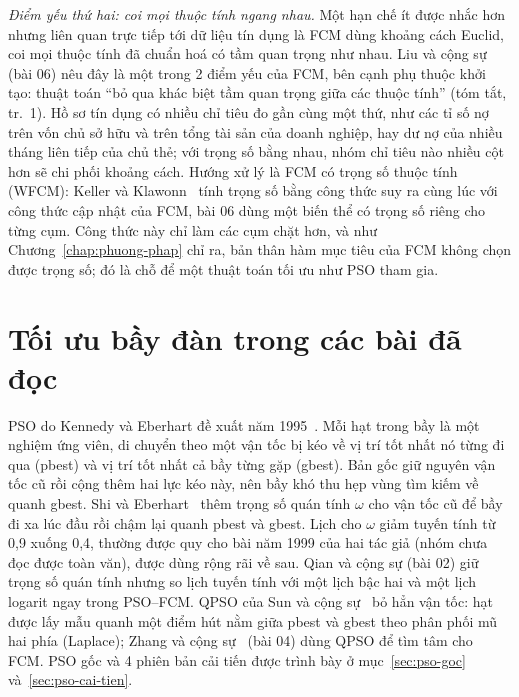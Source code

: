 \emph{Điểm yếu thứ hai: coi mọi thuộc tính ngang nhau.} Một hạn chế ít được nhắc hơn nhưng liên quan trực tiếp tới dữ liệu tín dụng là FCM dùng khoảng cách Euclid, coi mọi thuộc
tính đã chuẩn hoá có tầm quan trọng như nhau. Liu và cộng sự~\cite{liu2021msgwo} (bài 06) nêu đây là một trong 2 điểm yếu
của FCM, bên cạnh phụ thuộc khởi tạo: thuật toán ``bỏ qua khác biệt tầm quan trọng giữa các thuộc tính'' (tóm tắt, tr.~1).
Hồ sơ tín dụng có nhiều chỉ tiêu đo gần cùng một thứ, như các tỉ số nợ trên vốn chủ sở hữu và trên tổng tài sản của doanh
nghiệp, hay dư nợ của nhiều tháng liên tiếp của chủ thẻ; với trọng số bằng nhau, nhóm chỉ tiêu nào nhiều cột hơn sẽ chi
phối khoảng cách. Hướng xử lý là FCM có trọng số thuộc tính (WFCM): Keller và Klawonn~\cite{keller2000weighting} tính trọng
số bằng công thức suy ra cùng lúc với công thức cập nhật của FCM, bài 06 dùng một biến thể có trọng số riêng cho từng cụm.
Công thức này chỉ làm các cụm chặt hơn, và như Chương~\ref{chap:phuong-phap} chỉ ra, bản thân hàm mục tiêu của FCM không
chọn được trọng số; đó là chỗ để một thuật toán tối ưu như PSO tham gia.


\section{Tối ưu bầy đàn trong các bài đã đọc}
\label{sec:pso-tong-quan}

PSO do Kennedy và Eberhart đề xuất năm 1995~\cite{kennedy1995pso}. Mỗi hạt trong bầy là một nghiệm ứng viên, di chuyển
theo một vận tốc bị kéo về vị trí tốt nhất nó từng đi qua (pbest) và vị trí tốt nhất cả bầy từng gặp (gbest). Bản gốc giữ
nguyên vận tốc cũ rồi cộng thêm hai lực kéo này, nên bầy khó thu hẹp vùng tìm kiếm về quanh gbest. Shi và
Eberhart~\cite{shi1998inertia,shi1999empirical} thêm trọng số quán tính $\omega$ cho vận tốc cũ để bầy đi xa lúc đầu rồi
chậm lại quanh pbest và gbest. Lịch cho $\omega$ giảm tuyến tính từ 0,9 xuống 0,4, thường được quy cho bài năm 1999 của
hai tác giả (nhóm chưa đọc được toàn văn), được dùng rộng rãi về sau. Qian và cộng sự (bài 02) giữ trọng số quán tính nhưng so lịch tuyến tính
với một lịch bậc hai và một lịch logarit ngay trong PSO--FCM. QPSO của Sun và cộng sự~\cite{sun2004qpso,sun2004global}
bỏ hẳn vận tốc: hạt được lấy mẫu quanh một điểm hút nằm giữa pbest và gbest theo phân phối mũ hai phía (Laplace); Zhang và cộng sự~\cite{zhang2025qpsofcm}
(bài 04) dùng QPSO để tìm tâm cho FCM. PSO gốc và 4 phiên bản cải tiến
được trình bày ở mục~\ref{sec:pso-goc} và~\ref{sec:pso-cai-tien}.

